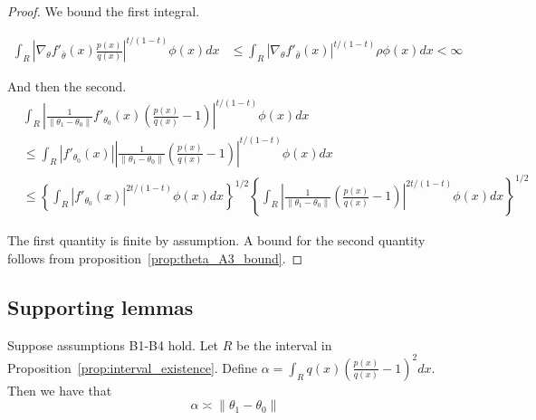 \begin{proof}
We bound the first integral.

\begin{align*}
 \int_R \left|  \nabla_{\theta} f'_{\bar{\theta}}(x) \frac{p(x)}{q(x)} \right|^{t/(1-t)} \phi(x) dx &\leq 
            \int_R \left|  \nabla_{\theta} f'_{\bar{\theta}}(x) \right|^{t/(1-t)} \rho \phi(x) dx  < \infty
\end{align*}
         
And then the second.
\begin{align*}
&  \int_R \left| \frac{1}{\| \theta_1 - \theta_0\|} f'_{\theta_0}(x) \left( \frac{p(x)}{q(x)} - 1 \right)  \right|^{t/(1-t)} \phi(x)dx \\
    &\leq \int_R | f'_{\theta_0}(x) | 
             \left|  \frac{1}{\| \theta_1 - \theta_0\|}  \left( \frac{p(x)}{q(x)} - 1 \right)  \right|^{t/(1-t)} \phi(x) dx \\
    &\leq \left\{ \int_R  | f'_{\theta_0}(x) |^{2t/(1-t)} \phi(x) dx \right\}^{1/2} 
         \left\{
            \int_R
             \left| \frac{1}{\| \theta_1 - \theta_0\|}  \left( \frac{p(x)}{q(x)} - 1 \right)  \right|^{2t/(1-t)} \phi(x) dx 
         \right\}^{1/2} 
\end{align*}

The first quantity is finite by assumption. A bound for the second quantity follows from proposition~\ref{prop:theta_A3_bound}.

\end{proof}



\subsection{Supporting lemmas}

\begin{lemma}
\label{lem:chi_square_theta_equivalence}
Suppose assumptions B1-B4 hold.
Let $R$ be the interval in Proposition~\ref{prop:interval_existence}. Define $\alpha = \int_R q(x) \left( \frac{p(x)}{q(x)} - 1 \right)^2 dx$. Then we have that
\[
\alpha \asymp \| \theta_1 - \theta_0 \|
\]

\end{lemma}

